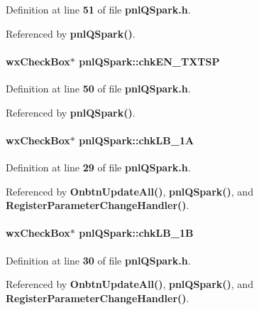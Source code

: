 Definition at line {\bf 51} of file {\bf pnl\+Q\+Spark.\+h}.



Referenced by {\bf pnl\+Q\+Spark()}.

\paragraph[{chk\+E\+N\+\_\+\+T\+X\+T\+SP}]{\setlength{\rightskip}{0pt plus 5cm}wx\+Check\+Box$\ast$ pnl\+Q\+Spark\+::chk\+E\+N\+\_\+\+T\+X\+T\+SP}\label{classpnlQSpark_a6e168ccf87a319998fb63ee3c169301c}


Definition at line {\bf 50} of file {\bf pnl\+Q\+Spark.\+h}.



Referenced by {\bf pnl\+Q\+Spark()}.

\paragraph[{chk\+L\+B\+\_\+1A}]{\setlength{\rightskip}{0pt plus 5cm}wx\+Check\+Box$\ast$ pnl\+Q\+Spark\+::chk\+L\+B\+\_\+1A}\label{classpnlQSpark_a58909da54e3e1b4a1fe76d82f642e86f}


Definition at line {\bf 29} of file {\bf pnl\+Q\+Spark.\+h}.



Referenced by {\bf Onbtn\+Update\+All()}, {\bf pnl\+Q\+Spark()}, and {\bf Register\+Parameter\+Change\+Handler()}.

\paragraph[{chk\+L\+B\+\_\+1B}]{\setlength{\rightskip}{0pt plus 5cm}wx\+Check\+Box$\ast$ pnl\+Q\+Spark\+::chk\+L\+B\+\_\+1B}\label{classpnlQSpark_a4b37b968ee8b7783ba4352fd12a42d0c}


Definition at line {\bf 30} of file {\bf pnl\+Q\+Spark.\+h}.



Referenced by {\bf Onbtn\+Update\+All()}, {\bf pnl\+Q\+Spark()}, and {\bf Register\+Parameter\+Change\+Handler()}.

